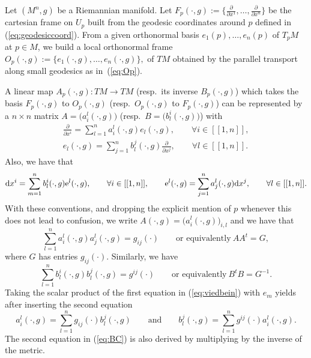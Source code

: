 \documentclass[pdftex]{sigma}
\numberwithin{equation}{section}
\theoremstyle{definition}
\begin{document}
Let $(M^n,g)$ be a Riemannian manifold. Let $F_p(\cdot,g):=\big\{\frac{\partial}{\partial x^1},\dots, \frac{\partial}{\partial x^n}\big\}$ be the cartesian frame on $U_p$ built from the geodesic coordinates around $p$ defined in (\ref{eq:geodesiccoord}). From a given orthonormal basis $e_1(p) ,\dots,e_n(p) $ of $T_pM$ at $p\in M$, we build a local orthonormal frame $O_p(\cdot, g):=\{e_1(\cdot, g),\dots,e_n(\cdot, g)\},$ of $TM$ obtained by the parallel transport along small geodesics as in~(\ref{eq:Op}).

A linear map $A_p(\cdot, g)\colon TM\to TM$ (resp.\ its inverse $B_p(\cdot,g)$) which takes the basis $F_p(\cdot, g)$ to $O_p(\cdot, g)$ (resp.\ $O_p(\cdot, g)$ to $F_p(\cdot, g)$) can be represented by a $n\times n$ matrix $A=\bigl( a_i^l(\cdot, g)\bigr)$ (resp.\ $B=\bigl(b_l^i(\cdot,g)\bigr) $) with
\begin{gather}
\frac{ \partial}{\partial x^i}=\sum_{l=1}^n a_i^l (\cdot, g) e_l(\cdot,g) ,\qquad \forall i\in [[1, n]],\nonumber\\
 e_l(\cdot,g)= \sum_{j=1}^nb_l^j(\cdot, g) \frac{\partial}{\partial x^j},\qquad \forall l\in [[1, n]].\label{eq:viedbein}
\end{gather}
 Also, we have that
\begin{equation*}%
{\rm d} x^i=\sum_{m=1}^n b_l^i(\cdot, g) {\rm e}^l(\cdot,g) ,\qquad \forall i\in [[1, n]],\qquad {\rm e}^l(\cdot,g)= \sum_{j=1}^na_j^l(\cdot, g) {\rm d} x^j,\qquad \forall l\in [[1, n]].
\end{equation*}
With these conventions, and dropping the explicit mention of $p$ whenever this does not lead to confusion, we write $A(\cdot, g)=\bigl(a_i^l(\cdot, g)\bigr)_{i,l}$ and we have that
\begin{equation}\label{eq:AAt}
\sum_{l=1}^n a_i^l(\cdot, g)a_j^l(\cdot, g)=g_{ij}(\cdot) \qquad\text{or equivalently}\ A A^t= G,
\end{equation}
where $G$ has entries $g_{ij}(\cdot)$. Similarly, we have
\begin{equation}\label{eq:BBt}
\sum_{l=1}^n b_l^i(\cdot,g) b_l^j(\cdot,g)=g^{ij}(\cdot)\qquad\text{or equivalently} \
B^t B=G^{-1}.
\end{equation}
Taking the scalar product of the first equation in (\ref{eq:viedbein}) with $e_m$ yields after inserting the second equation
\begin{equation}\label{eq:BC}
a_i^l(\cdot, g)= \sum_{l=1}^n g_{ij}(\cdot) b_l^j(\cdot, g) \qquad \text{and} \qquad b_l^j(\cdot, g)= \sum_{l=1}^n g^{ij}(\cdot) a_i^l(\cdot, g).
\end{equation}
The second equation in (\ref{eq:BC}) is also derived by multiplying by the inverse of the metric.
\end{document}
